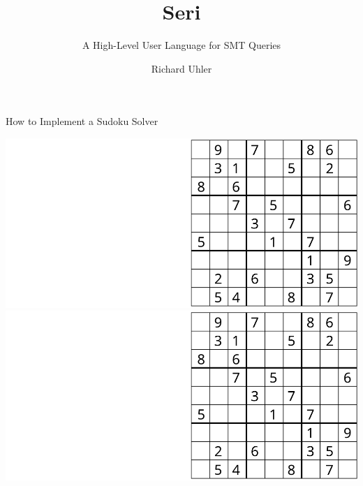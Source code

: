 \documentclass{beamer}
\title{Seri}
\subtitle{A High-Level User Language for SMT Queries}
\author{Richard Uhler}
\begin{document}
\begin{frame}
    \titlepage
\end{frame}

\begin{frame}{How to Implement a Sudoku Solver}
\begin{overprint}
 \includegraphics[width=\textwidth]{input1}
 \includegraphics[width=\textwidth]{input2}
\end{overprint}
\end{frame}
\end{document}
